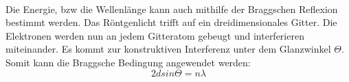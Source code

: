 \\
Die Energie, bzw die Wellenlänge kann auch mithilfe der Braggschen Reflexion bestimmt werden. Das Röntgenlicht trifft auf ein dreidimensionales Gitter. Die Elektronen werden nun an jedem Gitteratom gebeugt und interferieren miteinander. Es kommt zur konstruktiven Interferenz unter dem Glanzwinkel $\Theta$. Somit kann die Braggsche Bedingung angewendet werden:
\begin{equation}
\label{eq:5}
	2dsin\Theta = n\lambda
\end{equation}